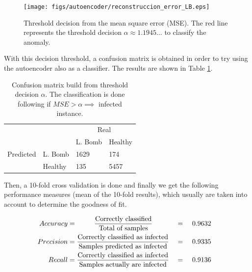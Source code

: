 \documentclass{iosart2c}
\begin{document}
\begin{figure}[h!]
\centering
\texttt{[image: figs/autoencoder/reconstruccion\_error\_LB.eps]}
\caption{Threshold decision from the mean square error (MSE). The red line represents the threshold decision $\alpha\approx1.1945\ldots$ to classify the anomaly.}
\label{fig:reconstuction_LB}
\end{figure}

With this decision threshold, a confusion matrix is obtained in order to try using the autoencoder also as a classifier. The results are shown in Table \ref{confusion_matrix}. \\

\begin{table}[h!]
\centering
\begin{tabular}{llll}
                                                &                                 & \multicolumn{2}{c}{Real}                                       \\ \cline{3-4} 
                                                & \multicolumn{1}{l|}{}           & \multicolumn{1}{l|}{L. Bomb} & \multicolumn{1}{l|}{Healthy} \\ \cline{2-4} 
\multicolumn{1}{c|}{Predicted} & \multicolumn{1}{l|}{L. Bomb} & \multicolumn{1}{l|}{1629}       & \multicolumn{1}{l|}{174}     \\ \cline{2-4} 
\multicolumn{1}{c|}{}                           & \multicolumn{1}{l|}{Healthy}    & \multicolumn{1}{l|}{135}        & \multicolumn{1}{l|}{5457}    \\ \cline{2-4} 
\end{tabular}
\caption{Confusion matrix build from threshold decision $\alpha$. The classification is done following if $MSE>\alpha\implies$ infected instance.}
\label{confusion_matrix}
\end{table}

Then, a 10-fold cross validation is done and finally we get the following performance measures (mean of the 10-fold results), which usually are taken into account to determine the goodness of fit.


\begin{alignat*}{3}
\hspace{-0.3cm} Accuracy  &= \hspace{0.9cm}\frac{\text{Correctly classified}}{\text{Total of samples}}           &&=&\text{ }& 0.9632 \\
\hspace{-0.3cm} Precision &=\frac{\text{Correctly classified as infected}}{\text{Samples predicted as infected}} &&=&\text{ }& 0.9335\\
\hspace{-0.3cm} Recall    &=\frac{\text{Correctly classified as infected}}{\text{Samples actually are infected}} &&=&\text{ }& 0.9136\\
\end{alignat*}
\end{document}
